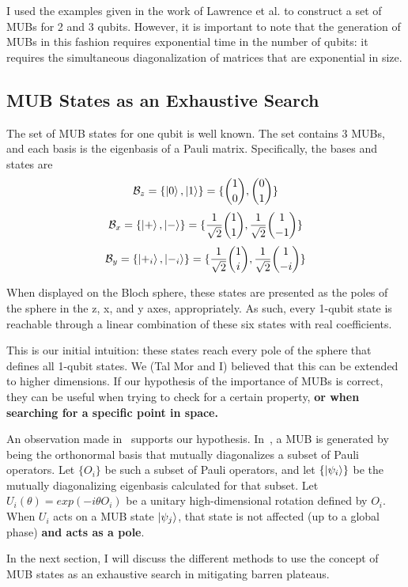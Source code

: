 \documentclass[a4paper,12pt]{article}
\newcommand{\base}{\mathcal{B}}
\newcommand{\tvect}[2]{{#1 \choose #2}}
\begin{document}
I used the examples given in the work of Lawrence et al. to construct a set of MUBs for 2 and 3 qubits.
However, it is important to note that the generation of MUBs in this fashion requires exponential time in the number of qubits: it requires the simultaneous diagonalization of matrices that are exponential in size.

\subsection{MUB States as an Exhaustive Search}

The set of MUB states for one qubit is well known. The set contains 3 MUBs, and each basis is the eigenbasis of a Pauli matrix.
Specifically, the bases and states are
$$ \base_z = \{ \ket{0}, \ket{1}\}  = \{\tvect{1}{0}, \tvect{0}{1}\}$$
$$ \base_x = \{ \ket{+}, \ket{-}\}  = \{\frac{1}{\sqrt{2}}\tvect{1}{1}, \frac{1}{\sqrt{2}}\tvect{1}{-1}\}$$
$$ \base_y = \{ \ket{+_i}, \ket{-_i}\}  = \{\frac{1}{\sqrt{2}}\tvect{1}{i}, \frac{1}{\sqrt{2}}\tvect{1}{-i}\}$$

When displayed on the Bloch sphere, these states are presented as the poles of the sphere in the z, x, and y axes, appropriately. As such, every 1-qubit state is reachable through a linear combination of these six states with real coefficients.

This is our initial intuition: these states reach every pole of the sphere that defines all 1-qubit states.
We (Tal Mor and I) believed that this can be extended to higher dimensions. If our hypothesis of the importance of MUBs is correct, they can be useful when trying to check for a certain property, \textbf{or when searching for a specific point in space.}

An observation made in~\cite{lawrence_mutually_2002} supports our hypothesis.
In~\cite{lawrence_mutually_2002}, a MUB is generated by being the orthonormal basis that mutually diagonalizes a subset of Pauli operators.
Let $\{O_i\}$ be such a subset of Pauli operators, and let $\{\ket{\psi_i}\}$ be the mutually diagonalizing eigenbasis calculated for that subset.
Let $U_i(\theta) = exp(-i\theta O_i)$ be a unitary high-dimensional rotation defined by $O_i$.
When $U_i$ acts on a MUB state $\ket{\psi_j}$, that state is not affected (up to a global phase) \textbf{and acts as a pole}.

In the next section, I will discuss the different methods to use the concept of MUB states as an exhaustive search in mitigating barren plateaus.
\end{document}
